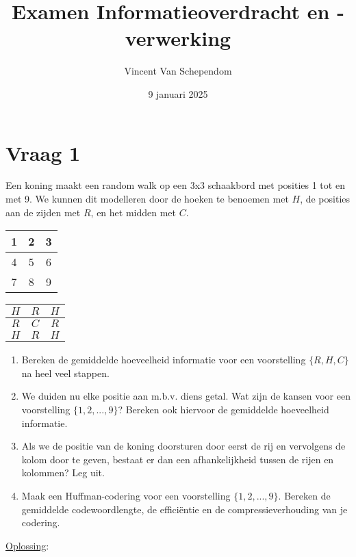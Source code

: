 \documentclass[kulak]{kulakarticle}
\title{Examen Informatieoverdracht en -verwerking}
\author{Vincent Van Schependom}
\date{9 januari 2025}
\begin{document}
	\maketitle

	\section*{Vraag 1}

	Een koning maakt een random walk op een 3x3 schaakbord met posities 1 tot en met 9. We kunnen dit modelleren door de hoeken te benoemen met \(H\), de posities aan de zijden met \(R\), en het midden met \(C\).

	\renewcommand{\arraystretch}{1.5}
	\begin{table}[h!]
		\centering
		\begin{tabular}{|c|c|c|}
			\hline
			1 & 2 & 3 \\
			\hline
			4 & 5 & 6 \\
			\hline
			7 & 8 & 9 \\
			\hline
		\end{tabular}
		\hspace{2cm}
		\begin{tabular}{|c|c|c|}
			\hline
			\(H\) & \(R\) & \(H\) \\
			\hline
			\(R\) & \(C\) & \(R\) \\
			\hline
			\(H\) & \(R\) & \(H\) \\
			\hline
		\end{tabular}
	\end{table}

	\begin{enumerate}
		\item Bereken de gemiddelde hoeveelheid informatie voor een voorstelling \(\{R,H,C\}\) na heel veel stappen.
		\item We duiden nu elke positie aan m.b.v. diens getal. Wat zijn de kansen voor een voorstelling \(\{1,2,...,9\}\)? Bereken ook hiervoor de gemiddelde hoeveelheid informatie.
		\item Als we de positie van de koning doorsturen door eerst de rij en vervolgens de kolom door te geven, bestaat er dan een afhankelijkheid tussen de rijen en kolommen? Leg uit.
		\item Maak een Huffman-codering voor een voorstelling \(\{1,2,...,9\}\). Bereken de gemiddelde codewoordlengte, de efficiëntie en de compressieverhouding van je codering.
	\end{enumerate}

	\underline{Oplossing}:
\end{document}
